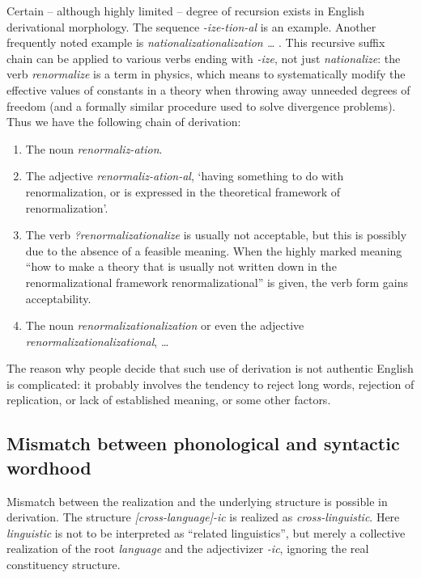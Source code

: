 \documentclass[UTF8, a4paper, oneside, scheme=plain, 12pt]{ctexbook}
\newcommand*{\citepage}[1]{p.~{#1}}
\newcommand{\form}[1]{\emph{#1}}
\newcommand{\translate}[1]{`#1'}
\begin{document}
Certain -- although highly limited -- degree of recursion exists in English derivational morphology.
The sequence \form{-ize-tion-al} is an example.
Another frequently noted example is \form{nationalizationalization \dots}
\citep[\citepage{xvii}]{roeper2014recursion}.
This recursive suffix chain can be applied to various verbs 
ending with \form{-ize},
not just \form{nationalize}:
the verb \form{renormalize} is a term in physics,
which means to systematically modify the effective values of constants in a theory 
when throwing away unneeded degrees of freedom 
(and a formally similar procedure used to solve divergence problems).
Thus we have the following chain of derivation:
\begin{enumerate}
    \item The noun \form{renormaliz-ation}.
    \item The adjective \form{renormaliz-ation-al},
    \translate{having something to do with renormalization,
    or is expressed in the theoretical framework of renormalization}.
    \item The verb \form{?renormalizationalize}
    is usually not acceptable,
    but this is possibly due to the absence of a feasible meaning.
    When the highly marked meaning
    ``how to make a theory that is usually not written down in the renormalizational framework
    renormalizational'' is given, 
    the verb form gains acceptability.
    \item The noun \form{renormalizationalization} 
    or even the adjective \form{renormalizationalizational}, \dots
\end{enumerate}
The reason why people decide that such use of derivation is not authentic English is complicated:
it probably involves the tendency to reject long words, 
rejection of replication,
or lack of established meaning,
or some other factors.

\subsection{Mismatch between phonological and syntactic wordhood}\label{sec:pos.word.mismatch}

Mismatch between the realization and the underlying structure 
is possible in derivation.
The structure \form{[cross-language]-ic} is realized as 
\form{cross-linguistic}.
Here \form{linguistic} is not to be interpreted as 
``related linguistics'',
but merely a collective realization of the root \form{language} and the adjectivizer \form{-ic},
ignoring the real constituency structure.
\end{document}
